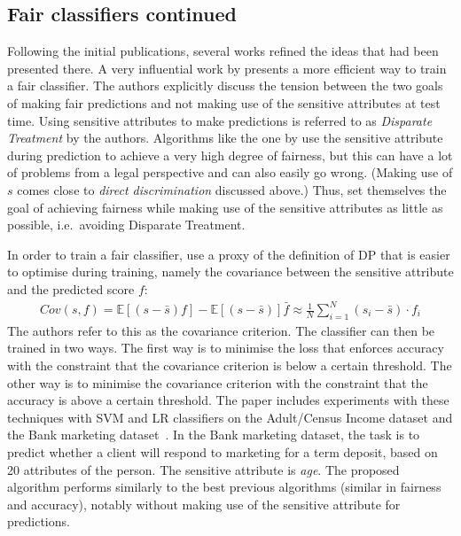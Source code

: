 \subsection{Fair classifiers continued} Following the initial publications, several works refined
the ideas that had been presented there. A very influential work by
\citet{zafar2017fairnessconstraints} presents a more efficient way to train a fair classifier. The
authors explicitly discuss the tension between the two goals of making fair predictions and not
making use of the sensitive attributes at test time. Using sensitive attributes to make predictions
is referred to as \emph{Disparate Treatment} by the authors. Algorithms like the one by
\citet{calders2009building} use the sensitive attribute during prediction to achieve a very high
degree of fairness, but this can have a lot of problems from a legal perspective and can also
easily go wrong. (Making use of \(s\) comes close to \emph{direct discrimination} discussed above.)
Thus, \citet{zafar2017fairnessconstraints} set themselves the goal of achieving fairness while
making use of the sensitive attributes as little as possible, i.e.~avoiding Disparate Treatment.

In order to train a fair classifier, \citet{zafar2017fairnessconstraints} use a proxy of the
definition of \ac{DP} that is easier to optimise during training, namely the covariance between the
sensitive attribute and the predicted score \(f\): \begin{align} \label{eq:zafar-constraint} Cov(s,
  f) = \mathbb{E}[(s - \bar{s})f] - \mathbb{E}[(s - \bar{s})]\bar{f} \approx \frac{1}{N}
\sum\limits_{i=1}^{N} (s_i - \bar{s}) \cdot f_i \end{align} The authors refer to this as the
covariance criterion. The classifier can then be trained in two ways. The first way is to minimise
the loss that enforces accuracy with the constraint that the covariance criterion is below a
certain threshold. The other way is to minimise the covariance criterion with the constraint that
the accuracy is above a certain threshold. The paper includes experiments with these techniques
with \ac{SVM} and \acf{LR} classifiers on the Adult/Census Income dataset and the Bank marketing
dataset~\citep{Dua:2017}. In the Bank marketing dataset, the task is to predict whether a client
will respond to marketing for a term deposit, based on 20 attributes of the person. The sensitive
attribute is \emph{age}. The proposed algorithm performs similarly to the best previous algorithms
(similar in fairness and accuracy), notably without making use of the sensitive attribute for
predictions.


